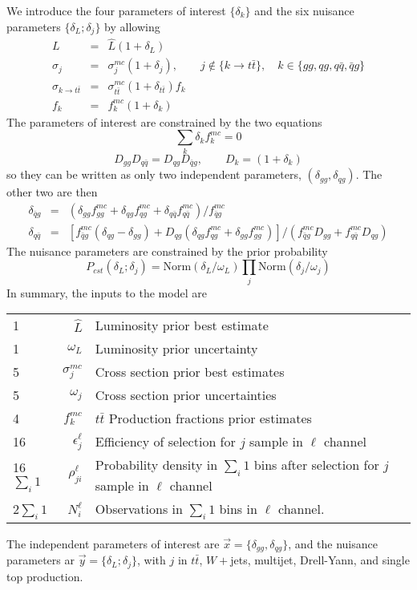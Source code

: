 \documentclass{article}
\begin{document}
We introduce the four parameters of interest $\{\delta_k\}$ and the
six nuisance parameters $\{\delta_L;\delta_j\}$ by allowing
\begin{eqnarray}
  L &=& \hat{L}(1+\delta_L) \\
  \sigma_j &=& \sigma_j^{mc}(1+\delta_j),\qquad j\notin \{k\to t\bar{t}\}, \quad k\in\{gg,qg,q\bar{q},\bar{q}g\}\\
  \sigma_{k\to t\bar{t}} &=& \sigma_{t\bar{t}}^{mc}(1+\delta_{t\bar{t}}) f_k\\
  f_k &=& f_k^{mc}(1+\delta_k)
\end{eqnarray}
The parameters of interest are constrained by the two equations
\begin{equation}
  \sum_k \delta_kf_k^{mc} = 0
\end{equation}
\begin{equation}
  D_{gg}D_{q\bar{q}} = D_{qg}D_{\bar{q}g}, \qquad D_k = (1+\delta_k)
\end{equation}
so they can be written as only two independent parameters,
$(\delta_{gg},\delta_{qg})$.  The other two are then
\begin{eqnarray}
  \delta_{\bar{q}g} &=& \left(\delta_{gg}f_{gg}^{mc}+\delta_{qg}f_{qg}^{mc}+\delta_{q\bar{q}}f_{q\bar{q}}^{mc}\right)/f_{\bar{q}g}^{mc}\\
  \delta_{q\bar{q}} &=& \left[f_{\bar{q}g}^{mc}(\delta_{qg}-\delta_{gg}) + D_{qg}(\delta_{qg}f_{qg}^{mc}+\delta_{gg}f_{gg}^{mc})\right] / \left(f_{\bar{q}g}^{mc}D_{gg} + f_{q\bar{q}}^{mc}D_{qg}\right)
\end{eqnarray}
The nuisance parameters are constrained by the prior probability
\begin{equation}
  P_{cst}(\delta_L;\delta_j) = \mathrm{Norm}(\delta_L/\omega_L)\prod_j\mathrm{Norm}(\delta_j/\omega_j)
\end{equation}
In summary, the inputs to the model are
\begin{center}
  \begin{tabular}{lrl}
    1&$\hat{L}$ & Luminosity prior best estimate \\
    1&$\omega_L$ & Luminosity prior uncertainty\\
    5&$\sigma_j^{mc}$ & Cross section prior best estimates\\
    5&$\omega_j$ & Cross section prior uncertainties\\
    4&$f^{mc}_k$ & $t\bar{t}$ Production fractions prior estimates\\
    16&$\epsilon_j^\ell$ & Efficiency of selection for $j$ sample in $\ell$ channel\\
    16$\sum_i1$&$\rho_{ji}^\ell$ & Probability density in $\sum_i1$ bins after selection for $j$ sample in $\ell$ channel\\
    2$\sum_i1$&$N_i^\ell$ & Observations in $\sum_i1$ bins in $\ell$ channel.
  \end{tabular}
\end{center}
The independent parameters of interest are $\vec{x} =
\{\delta_{gg},\delta_{qg}\}$, and the nuisance parameters ar $\vec{y}
= \{\delta_L;\delta_j\}$, with $j$ in $t\bar{t}$, $W+$jets, multijet,
Drell-Yann, and single top production.
\end{document}
